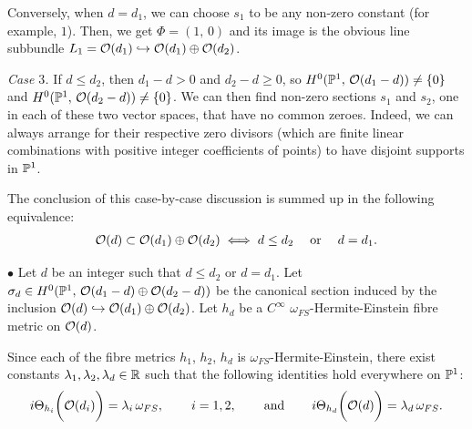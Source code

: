 \documentclass[12pt]{article}
\begin{document}
Conversely, when $d=d_1$, we can choose $s_1$ to be any non-zero constant (for example, $1$). Then, we get $\Phi=(1,\,0)$ and its image is the obvious line subbundle $L_1={\cal O}(d_1)\hookrightarrow{\cal O}(d_1)\oplus{\cal O}(d_2)$.


\vspace{1ex}

{\it Case $3$.} If $d\leq d_2$, then $d_1-d>0$ and $d_2-d\geq 0$, so $H^0(\mathbb{P}^1,\,{\cal O}(d_1-d))\neq\{0\}$ and $H^0(\mathbb{P}^1,\,{\cal O}(d_2-d))\neq\{0\}$. We can then find non-zero sections $s_1$ and $s_2$, one in each of these two vector spaces, that have no common zeroes. Indeed, we can always arrange for their respective zero divisors (which are finite linear combinations with positive integer coefficients of points) to have disjoint supports in $\mathbb{P}^1$.   

\vspace{1ex}

The conclusion of this case-by-case discussion is summed up in the following equivalence: \begin{eqnarray*}{\cal O}(d)\subset{\cal O}(d_1)\oplus{\cal O}(d_2) \iff d\leq d_2 \hspace{3ex}\mbox{or}\hspace{3ex} d=d_1.\end{eqnarray*}

\vspace{1ex}

$\bullet$ Let $d$ be an integer such that $d\leq d_2$ or $d=d_1$. Let $\sigma_d\in H^0(\mathbb{P}^1,\,{\cal O}(d_1-d)\oplus{\cal O}(d_2-d))$ be the canonical section induced by the inclusion ${\cal O}(d)\hookrightarrow{\cal O}(d_1)\oplus{\cal O}(d_2)$. Let $h_d$ be a $C^\infty$ $\omega_{FS}$-Hermite-Einstein fibre metric on ${\cal O}(d)$. 

Since each of the fibre metrics $h_1$, $h_2$, $h_d$ is $\omega_{FS}$-Hermite-Einstein, there exist constants $\lambda_1, \lambda_2,\lambda_d\in\mathbb{R}$ such that the following identities hold everywhere on $\mathbb{P}^1$: \begin{eqnarray*}i\Theta_{h_i}\bigg({\cal O}(d_i)\bigg) = \lambda_i\,\omega_{FS}, \hspace{5ex} i=1,2, \hspace{5ex}\mbox{and}\hspace{5ex} i\Theta_{h_d}\bigg({\cal O}(d)\bigg) = \lambda_d\,\omega_{FS}.\end{eqnarray*}
\end{document}
